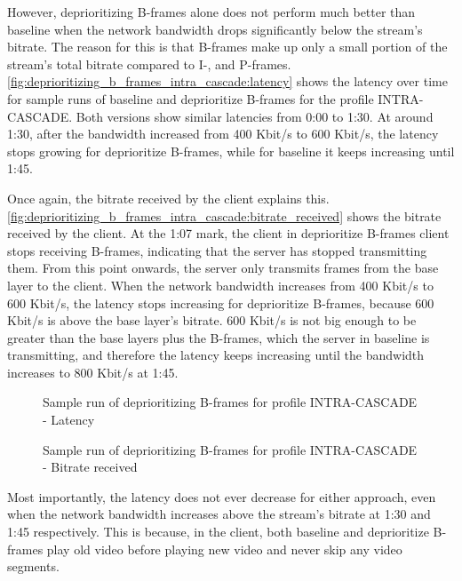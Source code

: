 However, deprioritizing B-frames alone does not perform much better than baseline when the network bandwidth drops significantly
below the stream's bitrate. The reason for this is that B-frames make up only a small portion of the stream's total bitrate
compared to I-, and P-frames. \autoref{fig:deprioritizing_b_frames_intra_cascade:latency} shows the latency over time for
sample runs of baseline and deprioritize B-frames for the profile INTRA-CASCADE. Both versions show similar latencies
from 0:00 to 1:30. At around 1:30, after the bandwidth increased from 400 Kbit/s to 600 Kbit/s, the latency
stops growing for deprioritize B-frames, while for baseline it keeps increasing until 1:45.


Once again, the bitrate received by the client explains this.
\autoref{fig:deprioritizing_b_frames_intra_cascade:bitrate_received} shows the bitrate received by the client.
At the 1:07 mark, the client in deprioritize B-frames client stops receiving B-frames, indicating that the server has stopped
transmitting them. From this point onwards, the server only transmits frames from the base layer to the client.
When the network bandwidth increases from 400 Kbit/s to 600 Kbit/s, the latency stops increasing for deprioritize B-frames,
because 600 Kbit/s is above the base layer's bitrate. %
600 Kbit/s is not big enough to be greater than the base layers plus the B-frames, which the server in baseline is transmitting, and therefore the latency keeps increasing until the bandwidth increases to 800 Kbit/s at 1:45. 

\begin{figure}
    \centering
    
    \caption{Sample run of deprioritizing B-frames for profile INTRA-CASCADE - Latency}
    \label{fig:deprioritizing_b_frames_intra_cascade:latency}
\end{figure}

\begin{figure}
    \centering
    
    \caption{Sample run of deprioritizing B-frames for profile INTRA-CASCADE - Bitrate received}
    \label{fig:deprioritizing_b_frames_intra_cascade:bitrate_received}
\end{figure}

Most importantly, the latency does not ever decrease for either approach, even when the network bandwidth increases above
the stream's bitrate at 1:30 and 1:45 respectively. This is because, in the client, both baseline and deprioritize B-frames
play old video before playing new video and never skip any video segments. 

